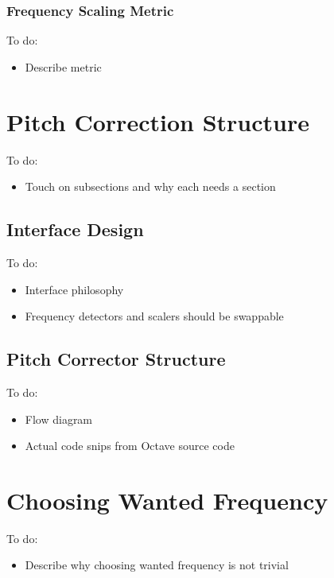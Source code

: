 \subsubsection{Frequency Scaling Metric}

\color{red}
To do:
\begin{itemize}
	\item Describe metric
\end{itemize}
\color{black}

\section{Pitch Correction Structure}

\color{red}
To do:
\begin{itemize}
	\item Touch on subsections and why each needs a section
\end{itemize}
\color{black}

\subsection{Interface Design}

\color{red}
To do:
\begin{itemize}
	\item Interface philosophy
	\item Frequency detectors and scalers should be swappable
\end{itemize}
\color{black}

\subsection{Pitch Corrector Structure}

\color{red}
To do:
\begin{itemize}
	\item Flow diagram
	\item Actual code snips from Octave source code
\end{itemize}
\color{black}

\section{Choosing Wanted Frequency}

\color{red}
To do:
\begin{itemize}
	\item Describe why choosing wanted frequency is not trivial
\end{itemize}
\color{black}

